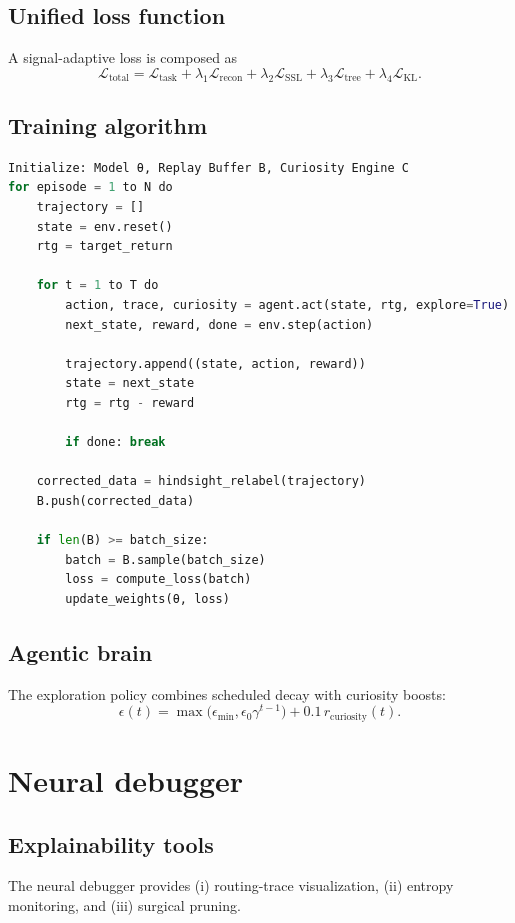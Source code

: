 \documentclass[11pt]{article}
\begin{document}
\subsection{Unified loss function}
A signal-adaptive loss is composed as
\begin{equation}
\mathcal{L}_{\text{total}} = \mathcal{L}_{\text{task}} + \lambda_1 \mathcal{L}_{\text{recon}} + \lambda_2 \mathcal{L}_{\text{SSL}} + \lambda_3 \mathcal{L}_{\text{tree}} + \lambda_4 \mathcal{L}_{\text{KL}}.
\end{equation}

\subsection{Training algorithm}
\begin{lstlisting}[language=Python,caption={Agentic training loop (sketch).}]
Initialize: Model θ, Replay Buffer B, Curiosity Engine C
for episode = 1 to N do
    trajectory = []
    state = env.reset()
    rtg = target_return

    for t = 1 to T do
        action, trace, curiosity = agent.act(state, rtg, explore=True)
        next_state, reward, done = env.step(action)

        trajectory.append((state, action, reward))
        state = next_state
        rtg = rtg - reward

        if done: break

    corrected_data = hindsight_relabel(trajectory)
    B.push(corrected_data)

    if len(B) >= batch_size:
        batch = B.sample(batch_size)
        loss = compute_loss(batch)
        update_weights(θ, loss)
\end{lstlisting}

\subsection{Agentic brain}
The exploration policy combines scheduled decay with curiosity boosts:
\begin{equation}
\epsilon(t) = \max\bigl(\epsilon_{\min},\epsilon_0\gamma^{t-1}\bigr) + 0.1\, r_{\mathrm{curiosity}}(t).
\end{equation}

\section{Neural debugger}\label{sec:debugger}
\subsection{Explainability tools}
The neural debugger provides (i) routing-trace visualization, (ii) entropy monitoring, and (iii) surgical pruning.
\end{document}
